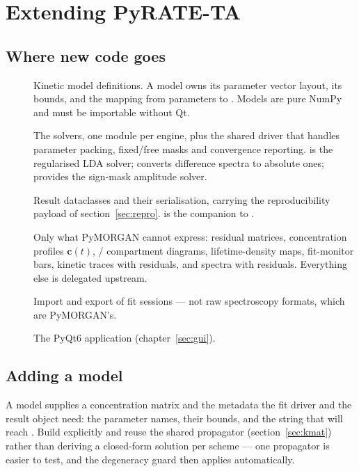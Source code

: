 \section{Extending PyRATE-TA}\label{sec:extending}

\subsection{Where new code goes}

\begin{description}
  \item[] Kinetic model definitions. A model owns its parameter
    vector layout, its bounds, and the mapping from parameters to \Cmat{}.
    Models are pure NumPy and must be importable without Qt.
  \item[] The solvers, one module per engine, plus the shared driver
    that handles parameter packing, fixed/free masks and convergence reporting.
     is the regularised LDA solver;
     converts difference spectra to absolute ones;
     provides the sign-mask amplitude solver.
  \item[] Result dataclasses and their serialisation, carrying
    the reproducibility payload of section~\ref{sec:repro}.
     is the companion to .
  \item[] Only what PyMORGAN cannot express: residual matrices,
    concentration profiles $\mathbf{c}(t)$, \Kmat{} / compartment diagrams,
    lifetime-density maps, fit-monitor bars, kinetic traces with residuals, and
    spectra with residuals. Everything else is delegated upstream.
  \item[] Import and export of fit sessions --- not raw spectroscopy
    formats, which are PyMORGAN's.
  \item[] The PyQt6 application (chapter~\ref{sec:gui}).
\end{description}

\subsection{Adding a model}

A model supplies a concentration matrix and the metadata the fit driver and the
result object need: the parameter names, their bounds, and the 
string that will reach . Build \Kmat{} explicitly
and reuse the shared propagator (section~\ref{sec:kmat}) rather than deriving a
closed-form solution per scheme --- one propagator is easier to test, and the
degeneracy guard then applies automatically.

